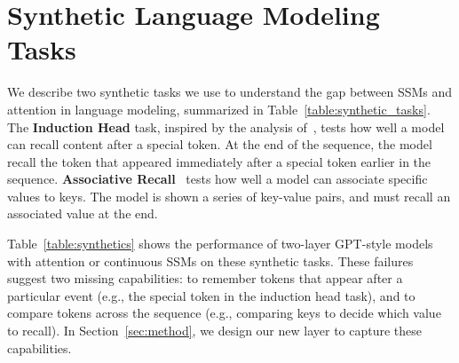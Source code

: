 \section{Synthetic Language Modeling Tasks}

We describe two synthetic tasks we use to understand the gap between SSMs and attention in language modeling, summarized in Table~\ref{table:synthetic_tasks}. The \textbf{Induction Head} task, inspired by the analysis of~\citet{olsson2022context}, tests how well a model can recall content after a special token.
At the end of the sequence, the model recall the token that appeared immediately after a special token earlier in the sequence. \textbf{Associative Recall}~\citep{ba2016using} tests how well a model can associate specific values to keys. The model is shown a series of key-value pairs, and must recall an associated value at the end.


Table~\ref{table:synthetics} shows the performance of two-layer GPT-style models with attention or continuous SSMs on these synthetic tasks.
These failures suggest two missing capabilities: to remember tokens that appear after a particular event (e.g., the special token in the induction head task), and to compare tokens across the sequence (e.g., comparing keys to decide which value to recall).
In Section~\ref{sec:method}, we design our new layer \hthree to capture these capabilities.